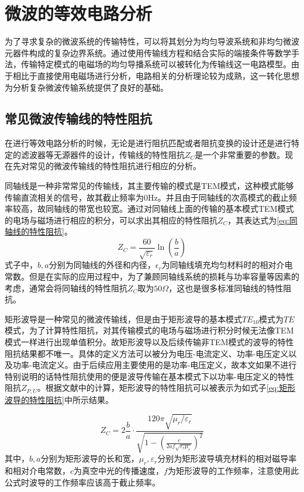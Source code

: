 \documentclass[master]{thesis-uestc}
\begin{document}
\section{微波的等效电路分析}
为了寻求复杂的微波系统的传输特性，可以将其划分为均匀导波系统和非均匀微波元器件构成的复杂边界系统。通过使用传输线方程和结合实际的端接条件等数学手法，传输特定模式的电磁场的均匀导播系统可以被转化为传输线这一电路模型。由于相比于直接使用电磁场进行分析，电路相关的分析理论较为成熟，这一转化思想为分析复杂微波传输系统提供了良好的基础。
\subsection{常见微波传输线的特性阻抗}
在进行等效电路分析的时候，无论是进行阻抗匹配或者阻抗变换的设计还是进行特定的滤波器等无源器件的设计，传输线的特性阻抗\(Z_C\)是一个非常重要的参数。现在先对常见的微波传输线的特性阻抗进行相应的分析。

同轴线是一种非常常见的传输线，其主要传输的模式是TEM模式，这种模式能够传输直流相关的信号，故其截止频率为0Hz。并且由于同轴线的次高模式的截止频率较高，故同轴线的带宽也较宽。通过对同轴线上面的传输的基本模式TEM模式的电场与磁场进行相应的积分，可以求出其相应的特性阻抗\(Z_C\)，其表达式为\ref{eq:同轴线的特性阻抗}。
\begin{equation}\label{eq:同轴线的特性阻抗}
    Z_C = \frac{60}{\sqrt{\varepsilon_r}} \ln \left( \frac{b}{a} \right)
\end{equation}
式子中，\(b, a\)分别为同轴线的外径和内径，\(\epsilon_r\)为同轴线填充均匀材料时的相对介电常数。但是在实际的应用过程中，为了兼顾同轴线系统的损耗与功率容量等因素的考虑，通常会将同轴线的特性阻抗\(Z_C\)取为\(50 \Omega\)，这也是很多标准同轴线的特性阻抗。

矩形波导是一种常见的微波传输线，但是由于矩形波导的基本模式\(TE_{10}\)模式为\(TE\)模式，为了计算特性阻抗，对其传输模式的电场与磁场进行积分时候无法像TEM模式一样进行出现单值积分。故矩形波导以及后续传输非TEM模式的波导的特性阻抗结果都不唯一。具体的定义方法可以被分为电压-电流定义、功率-电压定义以及功率-电流定义。由于后续应用主要使用的是功率-电压定义，故本文如果不进行特别说明的话特性阻抗使用的便是波导传输在基本模式下以功率-电压定义的特性阻抗\(Z_{P, U}\)。根据文献\cite{heihil_characteristic_2006}中的计算，矩形波导的特性阻抗可以被表示为如式子\ref{eq:矩形波导的特性阻抗}中所示结果。

\begin{equation}\label{eq:矩形波导的特性阻抗}
    Z_{C}=  2\frac{b}{a} \cdot \frac{120 \pi \sqrt{\mu_r / \varepsilon_r}}{\sqrt{1 - \left( \frac{c}{2af \sqrt{\varepsilon_r \mu_r}} \right)^2}} 
\end{equation}
其中，\(b, a\)分别为矩形波导的长和宽，\(\mu_r, \varepsilon_r\)分别为矩形波导填充材料的相对磁导率和相对介电常数，\(c\)为真空中光的传播速度，\(f\)为矩形波导的工作频率，注意使用此公式时波导的工作频率应该高于截止频率。
\end{document}
